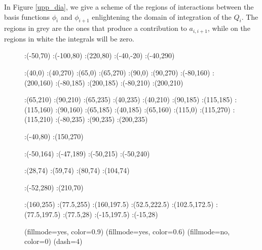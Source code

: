 {In Figure \ref{upp_dia}, we give a scheme of the regions of interactions between the basis functions $\phi_i$ and $\phi_{i+1}$ enlightening the domain of integration of the $Q_i$. The regions in grey are the ones that produce a contribution to $a_{i,i+1}$, while on the regions in white the integrals will be zero.
\begin{figure}[h]
\figinit{0.8pt}
:(-50,70)
:(-100,80) :(220,80)
:(-40,-20) :(-40,290)

:(40,0) :(40,270)
:(65,0) :(65,270)
:(90,0) :(90,270)
%
:(-80,160) :(200,160)
:(-80,185) :(200,185)
:(-80,210) :(200,210)
%

:(65,210) :(90,210)
:(65,235) :(40,235) 
:(40,210) :(90,185)
:(115,185) :(115,160)
:(90,160) :(65,185)
:(40,185) :(65,160) 
:(115,0) :(115,270) 
:(115,210) :(-80,235) 
:(90,235) :(200,235) 

:(-40,80) :(150,270)

:(-50,164) :(-47,189) 
:(-50,215) :(-50,240) 

:(28,74) :(59,74) 
:(80,74) :(104,74) 

:(-52,280) :(210,70)

:(160,255) :(77.5,255)
:(160,197.5) :(52.5,222.5)
:(102.5,172.5) :(77.5,197.5)
:(77.5,28) :(-15,197.5)
:(-15,28) 


\figdrawbegin{}

\figset(fillmode=yes, color=0.9)
\figdrawline[29,30,10,8,29]
\figdrawline[29,31,32,33,29]
\figdrawline[30,34,14,16,30]
\figdrawline[35,36,37,34,35]
\figdrawline[34,38,7,9,34]
\figdrawline[38,29,15,13,38]
\figset(fillmode=yes, color=0.6)
\figdrawline[29,30,34,38,29]
\figset(fillmode=no, color=0)
\figdrawarrow[1,2]
\figdrawarrow[3,4]
\figdrawline[8,31]
\figdrawline[10,30]
\figdrawline[30,16]
\figdrawline[35,14]
\figdrawline[35,36]
\figdrawline[36,37]
\figdrawline[37,9]
\figdrawline[38,7]
\figdrawline[38,13]
\figdrawline[33,15]
\figdrawline[32,33]
\figdrawline[32,31]
\figset(dash=4)
\figdrawline[6,32]
\figdrawline[39,5]
\figdrawline[40,11]
\figdrawline[36,12]
\figdrawline[36,41]
\figdrawline[42,43]
\figdrawline[32,44]
\figdrawline[45,46]


\end{figure}}
